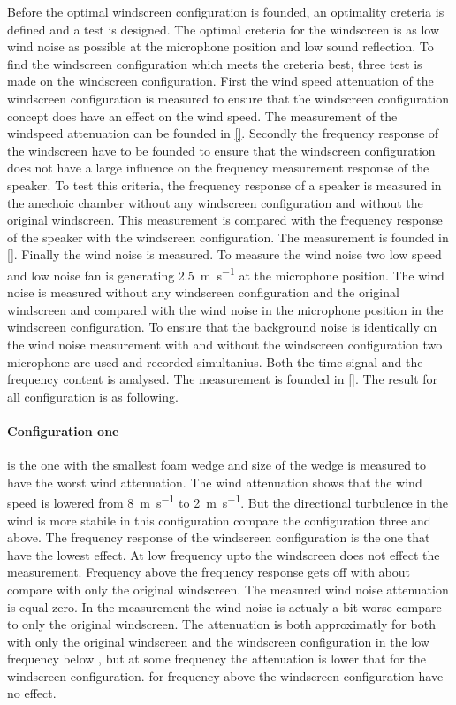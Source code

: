 Before the optimal windscreen configuration is founded, an optimality creteria is defined and a test is designed. The optimal creteria for the windscreen is as low wind noise as possible at the microphone position and low sound reflection. To find the windscreen configuration which meets the creteria best, three test is made on the windscreen configuration. First the wind speed attenuation of the windscreen configuration is measured to ensure that the windscreen configuration concept does have an effect on the wind speed. The measurement of the windspeed attenuation can be founded in \autoref{}. Secondly the frequency response of the windscreen have to be founded to ensure that the windscreen configuration does not have a large influence on the frequency measurement response of the speaker. To test this criteria, the frequency response of a speaker is measured in the anechoic chamber without any windscreen configuration and without the original windscreen. This measurement is compared with the frequency response of the speaker with the windscreen configuration. The measurement is founded in \autoref{}. Finally the wind noise is measured. To measure the wind noise two low speed and low noise fan is generating \SI{2.5}{\meter\per\second} at the microphone position. The wind noise is measured without any windscreen configuration and the original windscreen and compared with the wind noise in the microphone position in the windscreen configuration. To ensure that the background noise is identically on the wind noise measurement with and without the windscreen configuration two microphone are used and recorded simultanius. Both the time signal and the frequency content is analysed. The measurement is founded in \autoref{}. The result for all configuration is as following.

\paragraph{Configuration one} is the one with the smallest foam wedge and size of the wedge is measured to have the worst wind attenuation. The wind attenuation shows that the wind speed is lowered from \SI{8}{\meter\per\second} to \SI{2}{\meter\per\second}. But the directional turbulence in the wind is more stabile in this configuration compare the configuration three and above. The frequency response of the windscreen configuration is the one that have the lowest effect. At low frequency upto  the windscreen does not effect the measurement. Frequency above the frequency response gets off with about  compare with only the original windscreen. The measured wind noise attenuation is equal zero. In the measurement the wind noise is actualy a bit worse compare to only the original windscreen. The attenuation is both approximatly  for both with only the original windscreen and the windscreen configuration in the low frequency below , but at some frequency the attenuation is lower that  for the windscreen configuration. for frequency above  the windscreen configuration have no effect.

